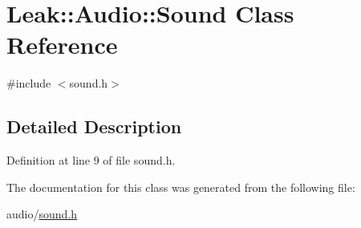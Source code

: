 \hypertarget{class_leak_1_1_audio_1_1_sound}{}\section{Leak\+:\+:Audio\+:\+:Sound Class Reference}
\label{class_leak_1_1_audio_1_1_sound}


{\ttfamily \#include $<$sound.\+h$>$}



\subsection{Detailed Description}


Definition at line 9 of file sound.\+h.



The documentation for this class was generated from the following file\+:\begin{DoxyCompactItemize}
\item 
audio/\hyperlink{sound_8h}{sound.\+h}\end{DoxyCompactItemize}

